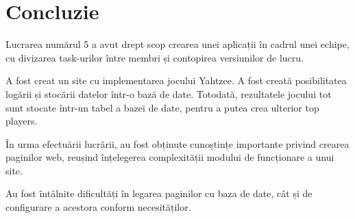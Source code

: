 \section*{Concluzie}

	Lucrarea numărul 5 a avut drept scop crearea unei aplicații în cadrul unei echipe, cu divizarea task-urilor între membri și contopirea versiunilor de lucru.
	
	A fost creat un site cu implementarea jocului Yahtzee. A fost creată posibilitatea logării și stocării datelor într-o bază de date. Totodată, rezultatele jocului tot sunt stocate într-un tabel a bazei de date, pentru a putea crea ulterior top players.
	
	În urma efectuării lucrării, au fost obținute cunoștințe importante privind crearea paginilor web, reușind înțelegerea complexității modului de funcționare a unui site.
	
	Au fost întâlnite dificultăți în legarea paginilor cu baza de date, cât și de configurare a acestora conform necesităților.

\clearpage